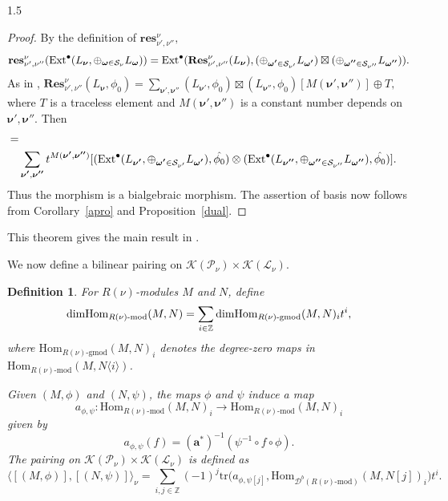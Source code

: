 \documentclass[10pt]{amsart}
\newtheorem{definition}[theorem]{Definition}
\def\Ext{\mbox{\rm Ext}}   \def\Ker{\mbox{\rm Ker}\,}
\def\dim{\mbox{\rm dim}}   \def\End{\mbox{\rm End}}
\def\Res{\mathbf{Res}}
\def\res{\mathbf{res}}
\newcommand\mk{{\mathcal{K}}}
\newcommand\mP{{\mathcal{P}}}
\newcommand\ml{{\mathcal{L}}}
\begin{document}
\begin{spacing}{1.5}
\begin{proof}
    By the definition of $\res_{\nu',\nu''}^{\nu},$ $$\res_{\nu',\nu''}^{\nu}(\Ext^{\bullet}(L_{\boldsymbol{\nu}},\oplus_{\boldsymbol{\omega}\in \mathcal{S}_{\nu}}L_{\boldsymbol{\omega}}))=\Ext^{\bullet}(\Res_{\nu',\nu''}^{\nu}(L_{\boldsymbol{\nu}}),(\oplus_{\boldsymbol{\omega'}\in \mathcal{S}_{\nu'}}L_{\boldsymbol{\omega'}})\boxtimes(\oplus_{\boldsymbol{\omega''}\in \mathcal{S}_{\nu''}}L_{\boldsymbol{\omega''}})).$$ As in \cite[Lemma 12.3.3]{lusztig2010introduction}, $\Res_{\nu',\nu''}^{\nu}(L_{\boldsymbol{\nu}},\phi_0)=\sum_{\boldsymbol{\nu'},\boldsymbol{\nu''}}(L_{\boldsymbol{\nu'}},\phi_0)\boxtimes (L_{\boldsymbol{\nu''}},\phi_0)[M(\boldsymbol{\nu'},\boldsymbol{\nu''})]\oplus T,$ where $T$ is a traceless element and $M(\boldsymbol{\nu'},\boldsymbol{\nu''})$ is a constant number depends on $\boldsymbol{\nu'},\boldsymbol{\nu''}.$ Then \begin{align*}
        [&\res_{\nu',\nu''}^{\nu}(\Ext^{\bullet}(L_{\boldsymbol{\nu}},\oplus_{\boldsymbol{\omega}\in \mathcal{S}_{\nu}}L_{\boldsymbol{\omega}}),\hat{\phi_0})]=\\&\sum_{\boldsymbol{\nu'},\boldsymbol{\nu''}}t^{M(\boldsymbol{\nu'},\boldsymbol{\nu''})}[(\Ext^{\bullet}(L_{\boldsymbol{\nu'}},\oplus_{\boldsymbol{\omega'}\in \mathcal{S}_{\nu'}}L_{\boldsymbol{\omega'}}),\hat{\phi_0})\otimes (\Ext^{\bullet}(L_{\boldsymbol{\nu''}},\oplus_{\boldsymbol{\omega''}\in \mathcal{S}_{\nu''}}L_{\boldsymbol{\omega''}}),\hat{\phi_0})].
    \end{align*}  Thus the morphism is a bialgebraic morphism.
    The assertion of basis now follows from Corollary~\ref{apro} and Proposition~\ref{dual}.
\end{proof}
This theorem gives the main result in \cite{https://doi.org/10.1112/jlms.12218}. 

We now define a bilinear pairing on $\mathcal{K}(\mathcal{P}_{\nu}) \times \mathcal{K}(\mathcal{L}_{\nu})$.

\begin{definition}
For $R(\nu)$-modules $M$ and $N$, define
\[
\dim \mathrm{Hom}_{R(\nu)\text{-}\mathrm{mod}}(M,N) = \sum_{i\in \mathbb{Z}} \dim \mathrm{Hom}_{R(\nu)\text{-}\mathrm{gmod}}(M,N)_i t^i,
\]
where $\mathrm{Hom}_{R(\nu)\text{-}\mathrm{gmod}}(M,N)_i$ denotes the degree-zero maps in $\mathrm{Hom}_{R(\nu)\text{-}\mathrm{mod}}(M,N\langle i\rangle)$.

Given $(M,\phi)$ and $(N,\psi)$, the maps $\phi$ and $\psi$ induce a map
\[
a_{\phi,\psi} : \mathrm{Hom}_{R(\nu)\text{-}\mathrm{mod}}(M,N)_i \to \mathrm{Hom}_{R(\nu)\text{-}\mathrm{mod}}(M,N)_i
\]
given by
\[
a_{\phi,\psi}(f) = (\mathbf{a}^*)^{-1}(\psi^{-1} \circ f \circ \phi).
\]
The pairing on $\mk(\mP_{\nu})\times \mk(\ml_{\nu})$ is defined as 
\[
\langle [(M,\phi)], [(N,\psi)] \rangle_{\nu} = \sum_{i,j \in \mathbb{Z}} (-1)^j \mathrm{tr}\bigl(a_{\phi,\psi[j]}, \mathrm{Hom}_{\mathcal{D}^{b}(R(\nu)\text{-}\mathrm{mod})}(M,N[j])_i\bigr) t^i.
\]
\end{definition}


\end{spacing}
\end{document}
